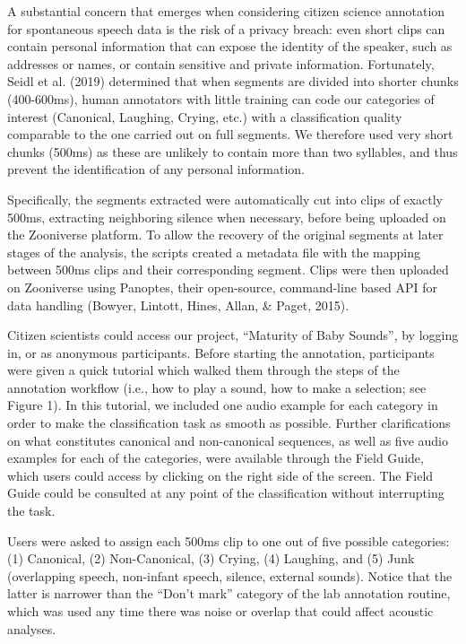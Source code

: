 \documentclass[english,,man,floatsintext]{apa6}
\begin{document}
A substantial concern that emerges when considering citizen science annotation for spontaneous speech data is the risk of a privacy breach: even short clips can contain personal information that can expose the identity of the speaker, such as addresses or names, or contain sensitive and private information. Fortunately, Seidl et al. (2019) determined that when segments are divided into shorter chunks (400-600ms), human annotators with little training can code our categories of interest (Canonical, Laughing, Crying, etc.) with a classification quality comparable to the one carried out on full segments. We therefore used very short chunks (500ms) as these are unlikely to contain more than two syllables, and thus prevent the identification of any personal information.

Specifically, the segments extracted were automatically cut into clips of exactly 500ms, extracting neighboring silence when necessary, before being uploaded on the Zooniverse platform. To allow the recovery of the original segments at later stages of the analysis, the scripts created a metadata file with the mapping between 500ms clips and their corresponding segment. Clips were then uploaded on Zooniverse using Panoptes, their open-source, command-line based API for data handling (Bowyer, Lintott, Hines, Allan, \& Paget, 2015).

Citizen scientists could access our project, \enquote{Maturity of Baby Sounds}, by logging in, or as anonymous participants. Before starting the annotation, participants were given a quick tutorial which walked them through the steps of the annotation workflow (i.e., how to play a sound, how to make a selection; see Figure 1). In this tutorial, we included one audio example for each category in order to make the classification task as smooth as possible. Further clarifications on what constitutes canonical and non-canonical sequences, as well as five audio examples for each of the categories, were available through the Field Guide, which users could access by clicking on the right side of the screen. The Field Guide could be consulted at any point of the classification without interrupting the task.

Users were asked to assign each 500ms clip to one out of five possible categories: (1) Canonical, (2) Non-Canonical, (3) Crying, (4) Laughing, and (5) Junk (overlapping speech, non-infant speech, silence, external sounds). Notice that the latter is narrower than the \enquote{Don't mark} category of the lab annotation routine, which was used any time there was noise or overlap that could affect acoustic analyses.
\end{document}
